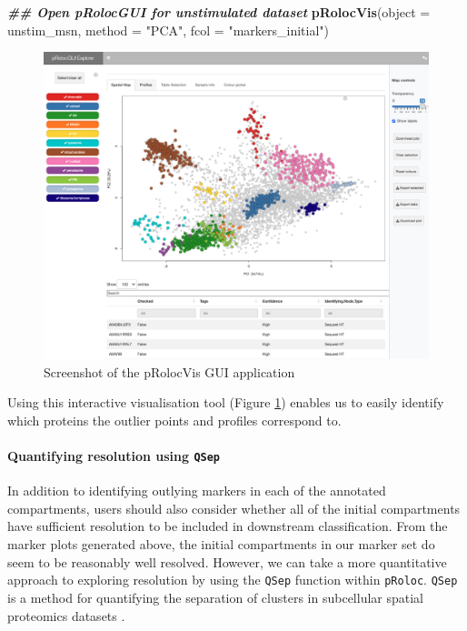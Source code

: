 \documentclass[9pt,a4paper,]{extarticle}
\newenvironment{Shaded}{\begin{snugshade}}{\end{snugshade}}
\newcommand{\AttributeTok}[1]{\textcolor[rgb]{0.13,0.29,0.53}{#1}}
\newcommand{\DocumentationTok}[1]{\textcolor[rgb]{0.56,0.35,0.01}{\textbf{\textit{#1}}}}
\newcommand{\FunctionTok}[1]{\textcolor[rgb]{0.13,0.29,0.53}{\textbf{#1}}}
\newcommand{\NormalTok}[1]{#1}
\newcommand{\StringTok}[1]{\textcolor[rgb]{0.31,0.60,0.02}{#1}}
\begin{document}
\begin{Shaded}
\begin{Highlighting}[]
\DocumentationTok{\#\# Open pRolocGUI for unstimulated dataset}
\FunctionTok{pRolocVis}\NormalTok{(}\AttributeTok{object =}\NormalTok{ unstim\_msn, }
          \AttributeTok{method =} \StringTok{"PCA"}\NormalTok{, }
          \AttributeTok{fcol =} \StringTok{"markers\_initial"}\NormalTok{)}
\end{Highlighting}
\end{Shaded}

\begin{figure}[H]

{\centering \includegraphics[width=0.8\linewidth,]{figs/pRolocVis_screenshot} 

}

\caption{Screenshot of the pRolocVis GUI application}\label{fig:pRolocvis-picture}
\end{figure}

Using this interactive visualisation tool (Figure \ref{fig:pRolocvis-picture})
enables us to easily identify which proteins the outlier points and profiles
correspond to.

\paragraph{\texorpdfstring{Quantifying resolution using \texttt{QSep}}{Quantifying resolution using QSep}}\label{quantifying-resolution-using-qsep}

In addition to identifying outlying markers in each of the annotated
compartments, users should also consider whether all of the initial compartments
have sufficient resolution to be included in downstream classification. From
the marker plots generated above, the initial compartments in our marker set do
seem to be reasonably well resolved. However, we can take a more quantitative
approach to exploring resolution by using the \texttt{QSep} function within \texttt{pRoloc}.
\texttt{QSep} is a method for quantifying the separation of clusters in subcellular spatial
proteomics datasets \citep{Gatto2019}.
\end{document}
